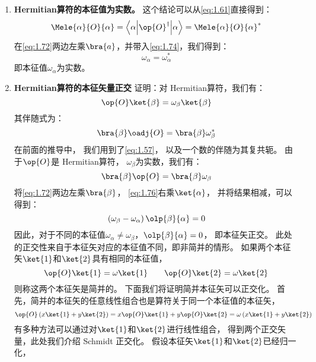 \begin{enumerate}[]
 \item {\bfseries Hermitian算符的本征值为实数。} 这个结论可以从\autoref{eq:1.61}直接得到：
 \begin{equation}
     \Mele{\alpha}{O}{\alpha} = \left\langle\alpha\middle\vert\op{O}^\dagger\middle\vert\alpha\right\rangle = {\Mele{\alpha}{O}{\alpha}}^\ast
     \label{eq:1.74}
 \end{equation}
 在\autoref{eq:1.72}两边左乘$\bra{a}$，并带入\autoref{eq:1.74}，我们得到：
 \begin{equation}
     \omega_\alpha = \omega_\alpha^\ast
     \label{eq:1.75}
 \end{equation}
 即本征值$\omega_\alpha$为实数。
 
 \item {\bfseries Hermitian算符的本征矢量正交} 证明：对 Hermitian算符，我们有：
 \[\op{O}\ket{\beta} = \omega_\beta \ket{\beta}\]
 其伴随式为：
 \[\bra{\beta}\oadj{O} = \bra{\beta}\omega_\beta^\ast\]
 在前面的推导中，
 我们用到了\autoref{eq:1.57}，
 以及一个数的伴随为其复共轭。
 由于$\op{O}$是 Hermitian算符，
 $\omega_\beta$为实数，我们有：
 \begin{equation}
     \bra{\beta}\op{O} = \bra{\beta}\omega_\beta
     \label{eq:1.76}
 \end{equation}
 将\autoref{eq:1.72}两边左乘$\bra{\beta}$，
 \autoref{eq:1.76}右乘$\ket{\alpha}$，
 并将结果相减，可以得到：
 \begin{equation}
     \left(\omega_\beta - \omega_\alpha\right)\olp{\beta}{\alpha} = 0
     \label{eq:1.77}
 \end{equation}
 因此，对于不同的本征值$\omega_\alpha \neq \omega_\beta$，$\olp{\beta}{\alpha} = 0$，
 即本征矢正交。
 此处的正交性来自于本征矢对应的本征值不同，即非简并的情形。
 如果两个本征矢$\ket{1}$和$\ket{2}$具有相同的本征值，
 \begin{equation}
     \op{O}\ket{1} = \omega\ket{1} \qquad \op{O}\ket{2} = \omega\ket{2}
     \label{eq:1.78}
 \end{equation}
 则称这两个本征矢是简并的。
 下面我们将证明简并本征矢可以正交化。
 首先，简并的本征矢的任意线性组合也是算符关于同一个本征值的本征矢，
 \begin{equation}
     \op{O}\left(x\ket{1}+y\ket{2}\right) = x\op{O}\ket{1} + y\op{O}\ket{2} = \omega\left(x\ket{1}+y\ket{2}\right)
     \label{eq:1.79}
 \end{equation}
 有多种方法可以通过对$\ket{1}$和$\ket{2}$进行线性组合，
 得到两个正交矢量，此处我们介绍 Schmidt 正交化。
 假设本征矢$\ket{1}$和$\ket{2}$已经归一化，

\end{enumerate}
